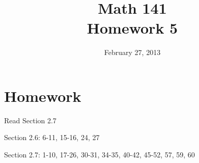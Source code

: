\documentclass{exam}
\date{February 27, 2013}
\title{Math 141 \\ Homework 5}
\begin{document}
\maketitle

\section{Homework}

\begin{itemize*}
  \item Read Section 2.7
  \item Section 2.6: 6-11, 15-16, 24, 27
  \item Section 2.7: 1-10, 17-26, 30-31, 34-35, 40-42, 45-52, 57, 59, 60
\end{itemize*}

\ifprintanswers
  \pagebreak
\fi
\end{document}
